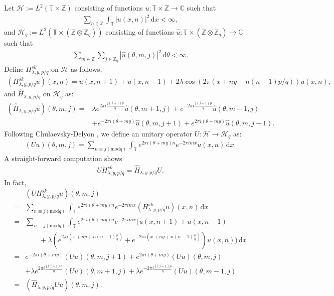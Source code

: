 \documentclass[11pt]{amsart}
\newcommand{\Z}{\mathbb Z}
\newcommand{\C}{\mathbb C}
\newcommand{\T}{\mathbb T}
\begin{document}
Let $\mathcal{H}:=L^2(\T\times \Z)$ consisting of functions $u:\T\times \Z\to \C$ such that
\begin{align}
    \sum_{n\in \Z} \int_{\T} |u(x,n)|^2\, \mathrm{d}x<\infty,
\end{align}
and $\mathcal{H}_q:=L^2(\T\times (\Z\otimes \Z_q))$ consisting of functions $\hat{u}:\T\times (\Z\otimes \Z_q)\to \C$ such that
\begin{align}
    \sum_{m\in \Z} \sum_{j\in \Z_q} |\hat{u}(\theta,m,j)|^2\, \mathrm{d}\theta<\infty.
\end{align}
Define $H^{sk}_{\lambda,y,p/q}$ on $\mathcal{H}$ as follows, 
\begin{align}
    (H^{sk}_{\lambda,y,p/q}u)(x,n)=u(x,n+1)+u(x,n-1)+2\lambda\cos(2\pi(x+ny+n(n-1)p/q))u(x,n),
\end{align}
and $\widehat{H}_{\lambda,y,p/q}$ on $\mathcal{H}_q$ as:
\begin{align}
    (\widehat{H}_{\lambda,y,p/q}\hat{u})(\theta,m,j)
    =&\lambda e^{2\pi i\frac{j(j-1)p}{q}}\hat{u}(\theta,m+1,j)+e^{-2\pi i\frac{j(j-1)p}{q}}\hat{u}(\theta,m-1,j)\\
    &+e^{-2\pi i(\theta+my)}\hat{u}(\theta,m,j+1)+e^{2\pi i(\theta+my)}\hat{u}(\theta,m,j-1).
\end{align}
Following Chulaevsky-Delyon \cite{CD}, we define an unitary operator $U:\mathcal{H}\to \mathcal{H}_q$ as:
\begin{align}\label{eq:def_unitary_U}
(Uu)(\theta,m,j)=\sum_{n\equiv j (\mathrm{mod} q)} \int_{\T} e^{2\pi i(\theta+m y)n}e^{-2\pi i mx} u(x,n)\, \mathrm{d}x.
\end{align}
A straight-forward computation shows
\begin{align}
    UH^{sk}_{\lambda,y,p/q}=\widehat{H}_{\lambda,y,p/q}U.
\end{align}
In fact, 
\begin{align}
    &(UH^{sk}_{\lambda,y,p/q}u)(\theta,m,j)\\
    =&\sum_{n\equiv j (\mathrm{mod} q)}\int_{\T} e^{2\pi i(\theta+my)n} e^{-2\pi i mx} (H^{sk}_{\lambda,y,p/q}u)(x,n)\, \mathrm{d}x\\
    =&\sum_{n\equiv j (\mathrm{mod} q)}\int_{\T} e^{2\pi i(\theta+my)n} e^{-2\pi i mx}(u(x,n+1)+u(x,n-1)\\
    &\qquad +\lambda (e^{2\pi i (x+ny+n(n-1)\frac{p}{q})}+e^{-2\pi i (x+ny+n(n-1)\frac{p}{q})})u(x,n))\, \mathrm{d}x\\
    =&e^{-2\pi i(\theta+my)}(Uu)(\theta,m,j+1)+e^{2\pi i(\theta+my)}(Uu)(\theta,m,j)\\
    &+\lambda e^{2\pi i \frac{j(j-1)p}{q}} (Uu)(\theta,m+1,j)+\lambda e^{-2\pi i\frac{j(j-1)p}{q}}(Uu)(\theta,m-1,j)\\
    =&(\widehat{H}_{\lambda,y,p/q}Uu)(\theta,m,j).
\end{align}
\end{document}
